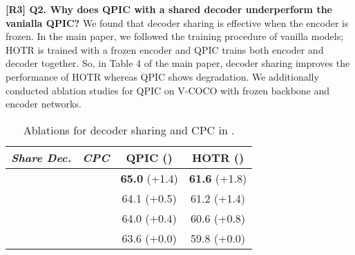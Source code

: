 \documentclass[10pt,twocolumn,letterpaper]{article}
\newcommand{\hjk}[1]{{\color{black}#1}}
\begin{document}
\hjk{
\noindent\textbf{[R3] Q2. Why does QPIC with a shared decoder underperform the vanialla QPIC?}\newline
We found that decoder sharing is effective when the encoder is frozen. 
In the main paper, we followed the training procedure of vanilla models; HOTR is trained with a frozen encoder and QPIC trains both encoder and decoder together. 
So, in Table 4 of the main paper, decoder sharing improves the performance of HOTR whereas QPIC shows degradation. 
We additionally conducted ablation studies for QPIC on V-COCO with frozen backbone and encoder networks. 
\vspace{-1.8mm}

\begin{table}[h]
    \centering
\footnotesize
\captionsetup{aboveskip=2pt}
    \begin{tabular}{c c  c  c}
         \toprule
          
\multirow{1}{*}{\textit{Share Dec.}} &
         \multirow{1}{*}{\textit{CPC}}& 
         \multirow{1}{*}{\textbf{QPIC} ()} &
        
         \multirow{1}{*}{\textbf{HOTR} ()} 
         
         \\
         
         \midrule    
      
         
      
         
         
         \checkmark &\checkmark &
         \textbf{65.0} \color{blue}(+1.4)&\textbf{61.6 } \color{blue}(+1.8) \\
         
        
          &\checkmark & 
         64.1 \color{blue}(+0.5) & 61.2 \color{blue}(+1.4) \\
         
        
         \checkmark  & &
         64.0 \color{blue}(+0.4)&60.6 \color{blue}(+0.8)
         \\
         
           & &
         63.6 \color{blue}(+0.0)&59.8 \color{blue}(+0.0)
         \\
         
        
         
         \bottomrule
    \end{tabular}
    \caption{
Ablations for decoder sharing and CPC in .}
    \label{table:abl_rebuttal}
\end{table}









}
\end{document}
